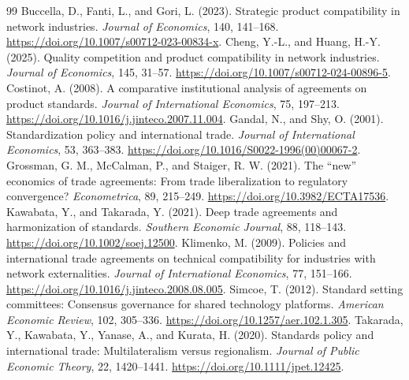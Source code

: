 \documentclass[11pt,a4paper]{article}
\theoremstyle{remark}\newtheorem{remark}[theorem]{Remark}
\begin{document}
\begin{thebibliography}{99}\footnotesize\setlength{\itemsep}{1pt}
 Buccella, D., Fanti, L., and Gori, L. (2023). Strategic product compatibility in network industries. \emph{Journal of Economics}, 140, 141--168. \url{https://doi.org/10.1007/s00712-023-00834-x}.
 Cheng, Y.-L., and Huang, H.-Y. (2025). Quality competition and product compatibility in network industries. \emph{Journal of Economics}, 145, 31--57. \url{https://doi.org/10.1007/s00712-024-00896-5}.
 Costinot, A. (2008). A comparative institutional analysis of agreements on product standards. \emph{Journal of International Economics}, 75, 197--213. \url{https://doi.org/10.1016/j.jinteco.2007.11.004}.
 Gandal, N., and Shy, O. (2001). Standardization policy and international trade. \emph{Journal of International Economics}, 53, 363--383. \url{https://doi.org/10.1016/S0022-1996(00)00067-2}.
 Grossman, G. M., McCalman, P., and Staiger, R. W. (2021). The ``new'' economics of trade agreements: From trade liberalization to regulatory convergence? \emph{Econometrica}, 89, 215--249. \url{https://doi.org/10.3982/ECTA17536}.
 Kawabata, Y., and Takarada, Y. (2021). Deep trade agreements and harmonization of standards. \emph{Southern Economic Journal}, 88, 118--143. \url{https://doi.org/10.1002/soej.12500}.
 Klimenko, M. (2009). Policies and international trade agreements on technical compatibility for industries with network externalities. \emph{Journal of International Economics}, 77, 151--166. \url{https://doi.org/10.1016/j.jinteco.2008.08.005}.
 Simcoe, T. (2012). Standard setting committees: Consensus governance for shared technology platforms. \emph{American Economic Review}, 102, 305--336. \url{https://doi.org/10.1257/aer.102.1.305}.
 Takarada, Y., Kawabata, Y., Yanase, A., and Kurata, H. (2020). Standards policy and international trade: Multilateralism versus regionalism. \emph{Journal of Public Economic Theory}, 22, 1420--1441. \url{https://doi.org/10.1111/jpet.12425}.
\end{thebibliography}
\end{document}
